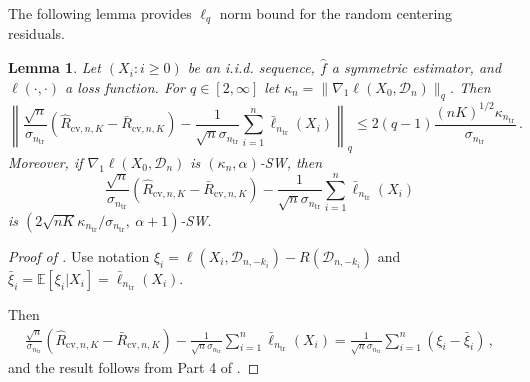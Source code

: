 \documentclass[11pt]{article}
\theoremstyle{plain}
\newtheorem{lemma}[theorem]{Lemma}
\newcommand{\cv}{{\mathrm{cv}}}
\newcommand{\tr}{{\mathrm{tr}}}
\newcommand{\D}{{\mathcal{D}}}
\begin{document}
The following lemma provides $\ell_q$ norm bound for the random centering residuals.
\begin{lemma}\label{lem:4.4-rand-center-residual-bound}
Let $(X_i:i\ge 0)$ be an i.i.d. sequence, $\hat f$ a symmetric estimator, and $\ell(\cdot,\cdot)$ a loss function. For $q\in[2,\infty]$ let $\kappa_n=\|\nabla_1\ell(X_0,\D_n)\|_q$. Then
$$
\left\|\frac{\sqrt{n}}{\sigma_{n_\tr}}(\hat R_{\cv,n,K}-\bar R_{\cv,n,K}) - \frac{1}{\sqrt{n}\sigma_{n_\tr}}\sum_{i=1}^n \bar\ell_{n_\tr}(X_i)\right\|_q\le 2(q-1)\frac{(nK)^{1/2}\kappa_{n_\tr}}{\sigma_{n_\tr}}\,.
$$
Moreover, if $\nabla_1\ell(X_0,\D_n)$ is $(\kappa_n,\alpha)$-SW, then
$$\frac{\sqrt{n}}{\sigma_{n_\tr}}(\hat R_{\cv,n,K}-\bar R_{\cv,n,K}) - \frac{1}{\sqrt{n}\sigma_{n_\tr}}\sum_{i=1}^n \bar\ell_{n_\tr}(X_i)$$
is $(2\sqrt{nK}\kappa_{n_\tr}/\sigma_{n_\tr},~\alpha+1)$-SW.
\end{lemma}
\begin{proof}
    [Proof of ]
    Use notation $\xi_i = \ell(X_i,\D_{n,-k_i}) - R(\D_{n,-k_i})$ and $\bar \xi_i =\mathbb E\left[\xi_i|X_i\right]=\bar\ell_{n_\tr}(X_i)$.

    Then
    \begin{align*}
\frac{\sqrt{n}}{\sigma_{n_\tr}}\left(\hat R_{\cv,n,K}-\bar R_{\cv,n,K}\right)-\frac{1}{\sqrt{n}\sigma_{n_\tr}}\sum_{i=1}^n\bar\ell_{n_\tr}(X_i)=\frac{1}{\sqrt{n}\sigma_{n_\tr}}\sum_{i=1}^n (\xi_i-\bar\xi_i)\,,
\end{align*}
and the result follows from Part 4 of .
\end{proof}





\end{document}
